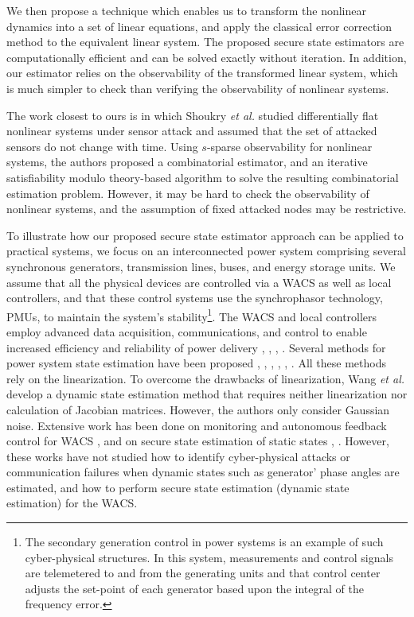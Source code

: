 We then propose a technique which enables us to transform the nonlinear dynamics into a set of linear equations, and apply the classical error correction method to the equivalent linear system. The proposed secure state estimators are computationally efficient and can be solved exactly without iteration. In addition, our estimator relies on the observability of the transformed linear system, which is much simpler to check than verifying the observability of nonlinear systems.


The work closest to ours is \cite{shoukry} in which Shoukry \textit{et al.} studied differentially flat nonlinear systems under sensor attack and assumed that the set of attacked sensors do not change with time. Using $s$-sparse observability for nonlinear systems, the authors proposed a combinatorial estimator, and an iterative satisfiability modulo theory-based algorithm to solve the resulting combinatorial estimation problem. However, it may be hard to check the observability of nonlinear systems, and the assumption of fixed attacked nodes may be restrictive.


To illustrate how our proposed secure state estimator approach can be applied to practical systems, we focus on an interconnected power system comprising several synchronous generators, transmission lines, buses, and energy storage units. We assume that all the physical devices are controlled via a WACS as well as local controllers, and that these control systems use the synchrophasor technology, PMUs, to maintain the system's stability\footnote{The secondary generation control in power systems is an example of such cyber-physical structures. In this system, measurements and control signals are telemetered to and from the generating units and that control center adjusts the set-point of each generator based upon the integral of the frequency error.}. The WACS and local controllers employ advanced data acquisition, communications, and control to enable increased efficiency and reliability of power delivery \cite{pmu_w_0}, \cite{pmu_w_1}, \cite{pmu_w_3}, \cite{wacs_ref8}. Several methods for power system state estimation have been proposed \cite{ref_v11}, \cite{ref_v12}, \cite{ref_v13}, \cite{ref_v14}, \cite{ref_v15}, \cite{ref_v16}. %
All these methods rely on the linearization. To overcome the drawbacks of linearization, Wang \textit{et al.} \cite{nonlin_est} develop a dynamic state estimation method that requires neither linearization nor calculation of Jacobian matrices. However, the authors only consider Gaussian noise. Extensive work has been done on monitoring and autonomous feedback control for WACS \cite{wacs_ref8}, and on secure state estimation of static states \cite{ref_v1}, \cite{Tong}. However, these works have not studied how to identify cyber-physical attacks or communication failures when dynamic states such as generator' phase angles are estimated, and how to perform secure state estimation (dynamic state estimation) for the WACS.


